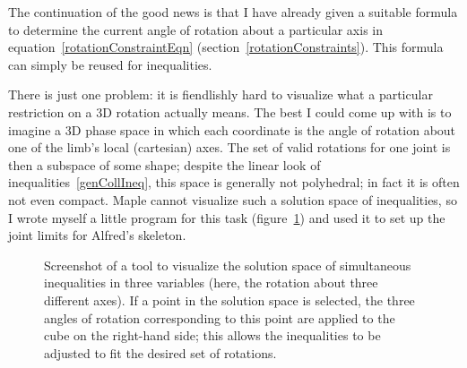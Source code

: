 The continuation of the good news is that I have already given a suitable formula to determine
the current angle of rotation about a particular axis in equation~\ref{rotationConstraintEqn}
(section~\ref{rotationConstraints}). This formula can simply be reused for inequalities.

There is just one problem: it is fiendlishly hard to visualize what a particular restriction on
a 3D rotation actually means. The best I could come up with is to imagine a 3D phase space in
which each coordinate is the angle of rotation about one of the limb's local (cartesian) axes.
The set of valid rotations for one joint is then a subspace of some shape; despite the linear
look of inequalities~\ref{genCollIneq}, this space is generally not polyhedral; in fact it is
often not even compact. Maple cannot visualize such a solution space of inequalities, so I wrote
myself a little program for this task (figure~\ref{jointLimit}) and used it to set up the joint
limits for Alfred's skeleton.

\begin{figure}
\centerline{}
\caption{Screenshot of a tool to visualize the solution space of simultaneous inequalities in
    three variables (here, the rotation about three different axes). If a point in the solution
    space is selected, the three angles of rotation corresponding to this point are applied to the
    cube on the right-hand side; this allows the inequalities to be adjusted to fit the desired
    set of rotations.\label{jointLimit}}
\end{figure}
